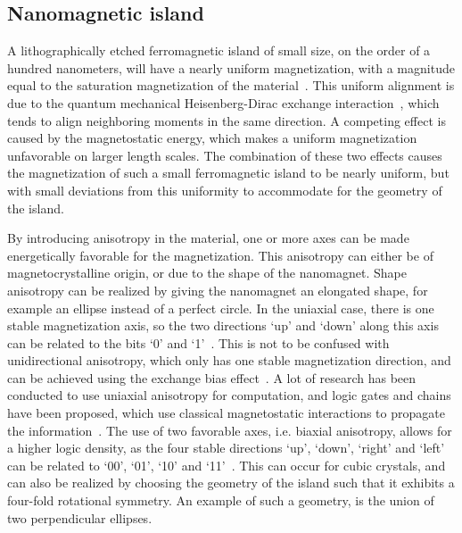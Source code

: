 \documentclass[11pt,a4paper,english,twoside]{article}
\begin{document}
\subsection{Nanomagnetic island}
A lithographically etched ferromagnetic island of small size, on the order of a hundred nanometers, will have a nearly uniform magnetization, with a magnitude equal to the saturation magnetization of the material~\cite{MQCA_RoomTemp,NML_Carlton}. This uniform alignment is due to the quantum mechanical Heisenberg-Dirac exchange interaction~\cite{MuMax3_advances, heisenberg1928theorie}, which tends to align neighboring moments in the same direction. A competing effect is caused by the magnetostatic energy, which makes a uniform magnetization unfavorable on larger length scales. The combination of these two effects causes the magnetization of such a small ferromagnetic island to be nearly uniform, but with small deviations from this uniformity to accommodate for the geometry of the island. \par
By introducing anisotropy in the material, one or more axes can be made energetically favorable for the magnetization. This anisotropy can either be of magnetocrystalline origin, or due to the shape of the nanomagnet. Shape anisotropy can be realized by giving the nanomagnet an elongated shape, for example an ellipse instead of a perfect circle. In the uniaxial case, there is one stable magnetization axis, so the two directions `up' and `down' along this axis can be related to the bits `0' and `1'~\cite{MQCA_RoomTemp}. This is not to be confused with unidirectional anisotropy, which only has one stable magnetization direction, and can be achieved using the exchange bias effect~\cite{ExchangeBias_Mechanisms,ExchangeBias_nanostructures,ExchangeBias}. A lot of research has been conducted to use uniaxial anisotropy for computation, and logic gates and chains have been proposed, which use classical magnetostatic interactions to propagate the information~\cite{GYP-18,MQCA_MajorityGate,SwitchingForced_EnergyEfficient}. The use of two favorable axes, i.e. biaxial anisotropy, allows for a higher logic density, as the four stable directions `up', `down', `right' and `left' can be related to `00', `01', `10' and `11'~\cite{MQCA_ImageRecognition}. This can occur for cubic crystals, and can also be realized by choosing the geometry of the island such that it exhibits a four-fold rotational symmetry. An example of such a geometry, is the union of two perpendicular ellipses.
\end{document}
